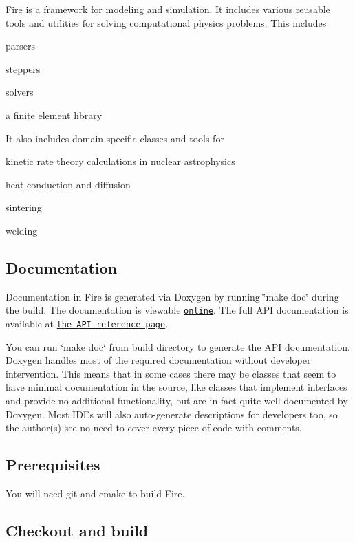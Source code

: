 Fire is a framework for modeling and simulation. It includes various reusable tools and utilities for solving computational physics problems. This includes
\begin{DoxyItemize}
\item parsers
\item steppers
\item solvers
\item a finite element library
\end{DoxyItemize}

It also includes domain-\/specific classes and tools for
\begin{DoxyItemize}
\item kinetic rate theory calculations in nuclear astrophysics
\item heat conduction and diffusion
\item sintering
\item welding
\end{DoxyItemize}

\subsection*{Documentation}

Documentation in Fire is generated via Doxygen by running \char`\"{}make doc\char`\"{} during the build. The documentation is viewable \href{http://www.jayjaybillings.com/fire}{\tt online}. The full A\+PI documentation is available at \href{http://www.jayjaybillings.com/fire/api/html/}{\tt the A\+PI reference page}.

You can run \char`\"{}make doc\char`\"{} from build directory to generate the A\+PI documentation. Doxygen handles most of the required documentation without developer intervention. This means that in some cases there may be classes that seem to have minimal documentation in the source, like classes that implement interfaces and provide no additional functionality, but are in fact quite well documented by Doxygen. Most I\+D\+Es will also auto-\/generate descriptions for developers too, so the author(s) see no need to cover every piece of code with comments.

\subsection*{Prerequisites}

You will need git and cmake to build Fire.

\subsection*{Checkout and build}

